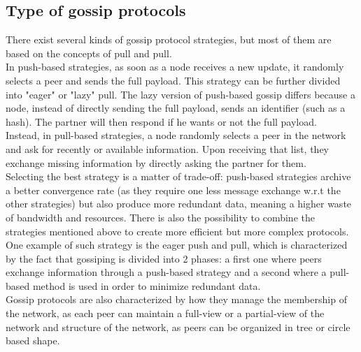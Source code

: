 \documentclass[mscthesis]{usiinfthesis}
\begin{document}
\subsection{Type of gossip protocols}
There exist several kinds of gossip protocol strategies, but most of them are based on the concepts of pull and pull. \\
In push-based strategies, as soon as a node receives a new update, it randomly selects a peer and sends the full payload. This strategy can be further divided into "eager" or "lazy" pull. The lazy version of push-based gossip differs because a node, instead of directly sending the full payload, sends an identifier (such as a hash). The partner will then respond if he wants or not the full payload. \\
Instead, in pull-based strategies, a node randomly selects a peer in the network and ask for recently or available information. Upon receiving that list, they exchange missing information by directly asking the partner for them. \\
Selecting the best strategy is a matter of trade-off: push-based strategies archive a better convergence rate (as they require one less message exchange w.r.t the other strategies) but also produce more redundant data, meaning a higher waste of bandwidth and resources.
There is also the possibility to combine the strategies mentioned above to create more efficient but more complex protocols. \\
One example of such strategy is the eager push and pull, which is characterized by the fact that gossiping is divided into 2 phases: a first one where peers exchange information through a push-based strategy and a second where a pull-based method is used in order to minimize redundant data. \\
Gossip protocols are also characterized by how they manage the membership of the network, as each peer can maintain a full-view or a partial-view of the network and structure of the network, as peers can be organized in tree or circle based shape. %
\end{document}
